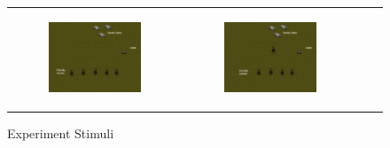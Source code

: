 \documentclass[11pt,letterpaper]{article}
\begin{document}
\begin{figure}
{\begin{tabular}{cccc}
\begin{subfigure}[b]{0.18\textwidth}\includegraphics[width=\textwidth]{figures/turrets.jpeg}\caption{}\label{fig:turrets-a}\end{subfigure}&
\begin{subfigure}[b]{0.18\textwidth}\includegraphics[width=\textwidth]{figures/turrets-plus-one.jpeg}\caption{}\label{fig:turrets-b}\end{subfigure}
\end{tabular}
}
\caption{Experiment Stimuli}
\label{fig:exp_stimuli}
\end{figure}

\end{document}
